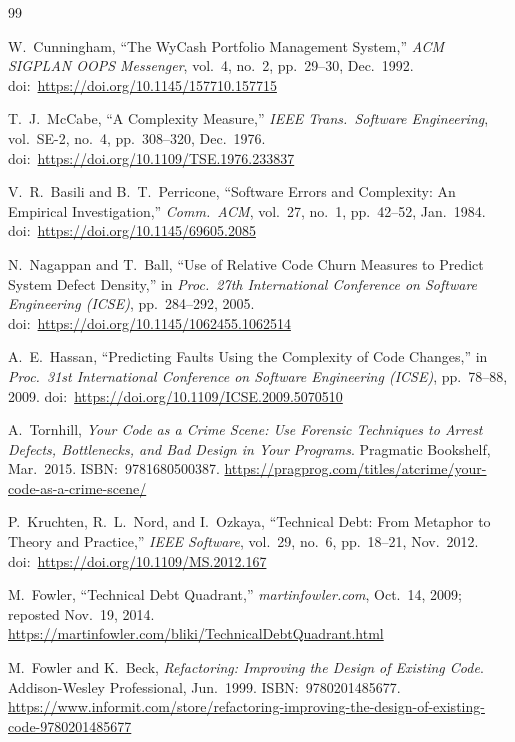\documentclass[12pt,a4paper]{article}
\begin{document}
\begin{thebibliography}{99}

W.\ Cunningham, ``The WyCash Portfolio Management System,'' \emph{ACM SIGPLAN OOPS Messenger}, vol.\ 4, no.\ 2, pp.\ 29--30, Dec.\ 1992.
doi:\ \url{https://doi.org/10.1145/157710.157715}

T.\ J.\ McCabe, ``A Complexity Measure,'' \emph{IEEE Trans.\ Software Engineering}, vol.\ SE-2, no.\ 4, pp.\ 308--320, Dec.\ 1976.
doi:\ \url{https://doi.org/10.1109/TSE.1976.233837}

V.\ R.\ Basili and B.\ T.\ Perricone, ``Software Errors and Complexity: An Empirical Investigation,'' \emph{Comm.\ ACM}, vol.\ 27, no.\ 1, pp.\ 42--52, Jan.\ 1984.
doi:\ \url{https://doi.org/10.1145/69605.2085}

N.\ Nagappan and T.\ Ball, ``Use of Relative Code Churn Measures to Predict System Defect Density,'' in \emph{Proc.\ 27th International Conference on Software Engineering (ICSE)}, pp.\ 284--292, 2005.
doi:\ \url{https://doi.org/10.1145/1062455.1062514}

A.\ E.\ Hassan, ``Predicting Faults Using the Complexity of Code Changes,'' in \emph{Proc.\ 31st International Conference on Software Engineering (ICSE)}, pp.\ 78--88, 2009.
doi:\ \url{https://doi.org/10.1109/ICSE.2009.5070510}

A.\ Tornhill, \emph{Your Code as a Crime Scene: Use Forensic Techniques to Arrest Defects, Bottlenecks, and Bad Design in Your Programs}. Pragmatic Bookshelf, Mar.\ 2015.
ISBN:\ 9781680500387. \url{https://pragprog.com/titles/atcrime/your-code-as-a-crime-scene/}

P.\ Kruchten, R.\ L.\ Nord, and I.\ Ozkaya, ``Technical Debt: From Metaphor to Theory and Practice,'' \emph{IEEE Software}, vol.\ 29, no.\ 6, pp.\ 18--21, Nov.\ 2012.
doi:\ \url{https://doi.org/10.1109/MS.2012.167}

M.\ Fowler, ``Technical Debt Quadrant,'' \emph{martinfowler.com}, Oct.\ 14, 2009; reposted Nov.\ 19, 2014.
\url{https://martinfowler.com/bliki/TechnicalDebtQuadrant.html}

M.\ Fowler and K.\ Beck, \emph{Refactoring: Improving the Design of Existing Code}. Addison-Wesley Professional, Jun.\ 1999.
ISBN:\ 9780201485677. \url{https://www.informit.com/store/refactoring-improving-the-design-of-existing-code-9780201485677}


\end{thebibliography}
\end{document}

